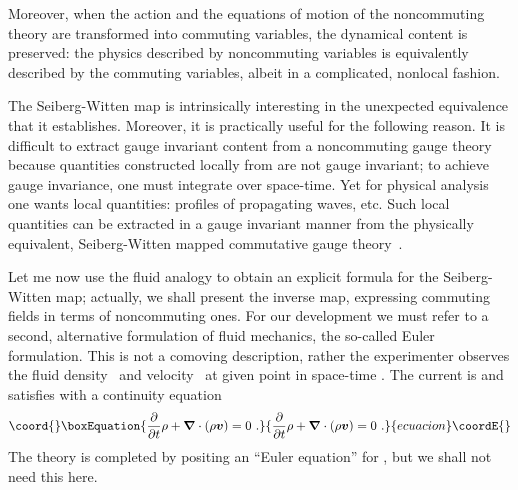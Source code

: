\documentclass[a4paper,12pt,twoside]{article}
\providecommand{\grad}{\vec\nabla}
\providecommand{\numeq}[2]{\begin{equation}\coord{}\boxEquation{
#2
\label{#1}
}{
#2
}{ecuacion}\coordE{}\end{equation}}
\let\vec\boldsymbol
\let\hat\widehat
\begin{document}
Moreover, when the action and the equations of motion of
the noncommuting theory are transformed into commuting variables, the dynamical content
is preserved: the physics described by noncommuting variables is equivalently described by
the commuting variables, albeit in a complicated, nonlocal fashion. 

  The Seiberg-Witten map is intrinsically interesting in the unexpected equivalence that it
establishes. Moreover, it is practically useful for the following reason. It is difficult to extract
gauge invariant content from a noncommuting gauge theory because quantities constructed
locally from \myHighlight{$\hat F_{\mu\nu}$}\coordHE{} are not gauge invariant; to achieve gauge invariance, one must
integrate over space-time. Yet for physical analysis one wants local quantities: profiles of
propagating waves, etc.  Such local quantities can be extracted in a gauge invariant manner
from the physically equivalent, Seiberg-Witten mapped commutative gauge theory~\cite{r8}. 

Let me now use the fluid analogy to obtain an explicit formula for the Seiberg-Witten map;
actually, we shall present the inverse map, expressing commuting fields in terms of
noncommuting ones. For our development we must refer to a second, alternative formulation
of fluid mechanics, the so-called Euler formulation. This is not a comoving description, rather
the experimenter observes the fluid density~\myHighlight{$\rho$}\coordHE{} and velocity~\myHighlight{$\vec v$}\coordHE{} at given point in
space-time \myHighlight{$(t,\vec r)$}\coordHE{}. The current is \myHighlight{$\rho \vec v$}\coordHE{} and satisfies with \myHighlight{$\rho$}\coordHE{} a continuity
equation
\numeq{e17}{
\frac\partial{\partial t} \rho + \grad \cdot (\rho\vec v) = 0\ . 
}
The theory is completed by  positing an ``Euler equation'' for \myHighlight{$\partial\vec v/\partial t$}\coordHE{}, but
we shall not need this here. 
\end{document}
